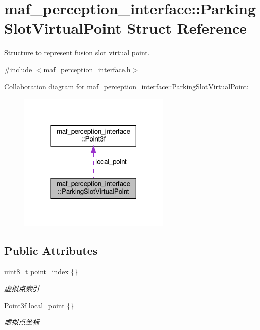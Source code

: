 \hypertarget{structmaf__perception__interface_1_1ParkingSlotVirtualPoint}{}\section{maf\+\_\+perception\+\_\+interface\+:\+:Parking\+Slot\+Virtual\+Point Struct Reference}
\label{structmaf__perception__interface_1_1ParkingSlotVirtualPoint}


Structure to represent fusion slot virtual point.  




{\ttfamily \#include $<$maf\+\_\+perception\+\_\+interface.\+h$>$}



Collaboration diagram for maf\+\_\+perception\+\_\+interface\+:\+:Parking\+Slot\+Virtual\+Point\+:\nopagebreak
\begin{figure}[H]
\begin{center}
\leavevmode
\includegraphics[width=206pt]{structmaf__perception__interface_1_1ParkingSlotVirtualPoint__coll__graph}
\end{center}
\end{figure}
\subsection*{Public Attributes}
\begin{DoxyCompactItemize}
\item 
uint8\+\_\+t \hyperlink{structmaf__perception__interface_1_1ParkingSlotVirtualPoint_aa9622d31c2cde63a9e0040aa0057cba2}{point\+\_\+index} \{\}
\begin{DoxyCompactList}\small\item\em 虚拟点索引 \end{DoxyCompactList}\item 
\hyperlink{structmaf__perception__interface_1_1Point3f}{Point3f} \hyperlink{structmaf__perception__interface_1_1ParkingSlotVirtualPoint_a99a9f7bd77daf6d98815d42455058115}{local\+\_\+point} \{\}
\begin{DoxyCompactList}\small\item\em 虚拟点坐标 \end{DoxyCompactList}\end{DoxyCompactItemize}


